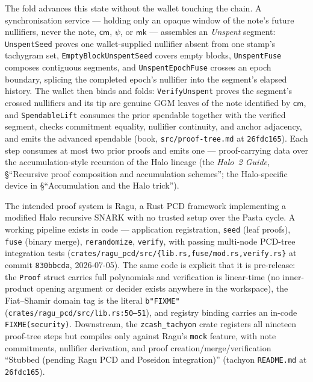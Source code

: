\documentclass[11pt,a4paper]{article}
\theoremstyle{definition}
\newcommand{\cmsym}{\mathsf{cm}}
\begin{document}
The fold advances this state without the wallet touching the chain. A
synchronisation service --- holding only an opaque window of the note's
future nullifiers, never the note, $\cmsym$, $\psi$, or $\mathsf{mk}$ ---
assembles an \emph{Unspent} segment: \texttt{UnspentSeed} proves one
wallet-supplied nullifier absent from one stamp's tachygram set,
\texttt{EmptyBlockUnspentSeed} covers empty blocks, \texttt{UnspentFuse}
composes contiguous segments, and \texttt{UnspentEpochFuse} crosses an epoch
boundary, splicing the completed epoch's nullifier into the segment's
elapsed history. The wallet then binds and folds: \texttt{VerifyUnspent}
proves the segment's crossed nullifiers and its tip are genuine GGM leaves of
the note identified by $\cmsym$, and \texttt{SpendableLift} consumes the
prior spendable together with the verified segment, checks commitment
equality, nullifier continuity, and anchor adjacency, and emits the advanced
spendable (book, \texttt{src/proof-tree.md} at \texttt{26fdc165}). Each step
consumes at most two prior proofs and emits one --- proof-carrying data over
the accumulation-style recursion of the Halo lineage (the \emph{Halo~2
Guide}, \S``Recursive proof composition and accumulation schemes''; the
Halo-specific device in \S``Accumulation and the Halo trick'').

The intended proof system is Ragu, a Rust PCD framework implementing a
modified Halo recursive SNARK with no trusted setup over the Pasta cycle. A
working pipeline exists in code --- application registration, \texttt{seed}
(leaf proofs), \texttt{fuse} (binary merge), \texttt{rerandomize},
\texttt{verify}, with passing multi-node PCD-tree integration tests
(\texttt{crates/ragu\_pcd/src/\{lib.rs,fuse/mod.rs,verify.rs\}} at commit
\texttt{830bbcda}, 2026-07-05). The same code is explicit that it is
pre-release: the \texttt{Proof} struct carries full polynomials and
verification is linear-time (no inner-product opening argument or decider
exists anywhere in the workspace), the Fiat--Shamir domain tag is the
literal \texttt{b"FIXME"} (\texttt{crates/ragu\_pcd/src/lib.rs:50--51}), and
registry binding carries an in-code \texttt{FIXME(security)}. Downstream,
the \texttt{zcash\_tachyon} crate registers all nineteen proof-tree steps but
compiles only against Ragu's \texttt{mock} feature, with note commitments,
nullifier derivation, and proof creation/merge/verification ``Stubbed
(pending Ragu PCD and Poseidon integration)'' (tachyon \texttt{README.md} at
\texttt{26fdc165}).
\end{document}
